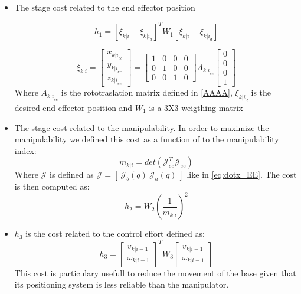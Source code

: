 \begin{itemize}

\item The stage cost related to the end effector position

\begin{equation}
	h_1 = [\xi_{k|i}-\xi_{{k|i}_{d}}]^T W_1[\xi_{k|i}-\xi_{{k|i}_{d}}]
\end{equation}

\begin{equation} 
 \xi_{k|i} = \left[ \begin{matrix} x_{{k|i}_{ee}} \\ y_{{k|i}_{ee}} \\ z_{{k|i}_{ee}} 
\end{matrix} \right] = \left[ \begin{matrix}
1 & 0 & 0 & 0 \\ 0 & 1 & 0 & 0 \\ 0 & 0 & 1 & 0
\end{matrix} \right]A_{{k|i}_{ee}}\left[ \begin{matrix}
0 \\ 0 \\ 0 \\ 1
\end{matrix} \right]%
\end{equation} 
Where $A_{{k|i}_{ee}}$ is the rototraslation matrix defined in \ref{AAAA}, $\xi_{{k|i}_{d}}$ is the desired end effector position and $W_1$ is a 3X3 weigthing matrix

\item The stage cost related to the manipulability. In order to maximize the manipulability we defined this cost as a function of to the manipulability index:
\begin{equation}
m_{k|i} =  det(\mathcal{J}_{ee}^T\mathcal{J}_{ee})
\end{equation}
Where $\mathcal{J}$ is defined as $\mathcal{J}=[\ \mathcal{J}_b(q)\ \mathcal{J}_a(q)\ ]$ like in \ref{eq:dotx_EE}. The cost is then computed as: 
\begin{equation}
	h_2 = W_2 \left( \frac{1}{m_{k|i}} \right)^2
\end{equation}
    
\item $h_3$ is the cost related to the control effort defined as: 
	\begin{equation}
	        h_3=\left[ \begin{matrix} v_{k|i-1} \\ \omega_{k|i-1} \end{matrix}\right]^T W_3 \left[ \begin{matrix} v_{k|i-1} \\ \omega_{k|i-1} \end{matrix}\right]
	 \end{equation}
This cost is particulary usefull to reduce the movement of the base given that its positioning system is less reliable than the manipulator.
\end{itemize}
